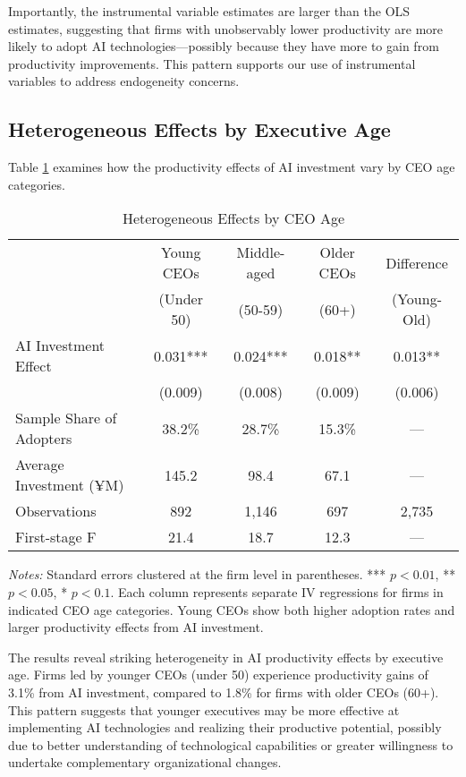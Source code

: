 \documentclass[12pt, a4paper]{article}
\begin{document}
Importantly, the instrumental variable estimates are larger than the OLS estimates, suggesting that firms with unobservably lower productivity are more likely to adopt AI technologies—possibly because they have more to gain from productivity improvements. This pattern supports our use of instrumental variables to address endogeneity concerns.

\subsection{Heterogeneous Effects by Executive Age}

Table \ref{tab:age_heterogeneity} examines how the productivity effects of AI investment vary by CEO age categories.

\begin{table}[H]
\centering
\caption{Heterogeneous Effects by CEO Age}
\label{tab:age_heterogeneity}
\begin{tabular}{lcccc}
\toprule
 & Young CEOs & Middle-aged & Older CEOs & Difference \\
 & (Under 50) & (50-59) & (60+) & (Young-Old) \\
\midrule
AI Investment Effect & 0.031*** & 0.024*** & 0.018** & 0.013** \\
 & (0.009) & (0.008) & (0.009) & (0.006) \\
\midrule
Sample Share of Adopters & 38.2\% & 28.7\% & 15.3\% & --- \\
Average Investment (¥M) & 145.2 & 98.4 & 67.1 & --- \\
\midrule
Observations & 892 & 1,146 & 697 & 2,735 \\
First-stage F & 21.4 & 18.7 & 12.3 & --- \\
\bottomrule
\end{tabular}
\begin{minipage}{\textwidth}
\footnotesize
\textit{Notes:} Standard errors clustered at the firm level in parentheses. *** $p<0.01$, ** $p<0.05$, * $p<0.1$. Each column represents separate IV regressions for firms in indicated CEO age categories. Young CEOs show both higher adoption rates and larger productivity effects from AI investment.
\end{minipage}
\end{table}

The results reveal striking heterogeneity in AI productivity effects by executive age. Firms led by younger CEOs (under 50) experience productivity gains of 3.1\% from AI investment, compared to 1.8\% for firms with older CEOs (60+). This pattern suggests that younger executives may be more effective at implementing AI technologies and realizing their productive potential, possibly due to better understanding of technological capabilities or greater willingness to undertake complementary organizational changes.
\end{document}
